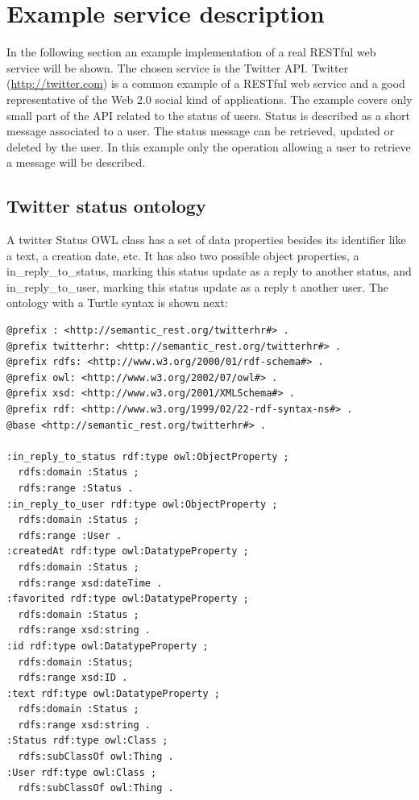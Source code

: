 \section{Example service description}
In the following section an example implementation of a real RESTful web service will be shown. The chosen service is the Twitter API. Twitter (\url{http://twitter.com}) is a common example of a RESTful web service and a good representative of the Web 2.0 social kind of applications. The example covers only small part of the API related to the status of users. Status is described as a short message associated to a user. The status message can be retrieved, updated or deleted by the user. In this example only the operation allowing a user to retrieve a message will be described.

\subsection{Twitter status ontology}

A twitter Status OWL class has a set of data properties besides its identifier like a text, a creation date, etc. It has also two possible object properties, a in\_reply\_to\_status, marking this status update as a reply to another status, and in\_reply\_to\_user, marking this status update as a reply t another user. The ontology with a Turtle syntax is shown next:
\vspace{5 mm}
\begin{lstlisting}
@prefix : <http://semantic_rest.org/twitterhr#> .
@prefix twitterhr: <http://semantic_rest.org/twitterhr#> .
@prefix rdfs: <http://www.w3.org/2000/01/rdf-schema#> .
@prefix owl: <http://www.w3.org/2002/07/owl#> .
@prefix xsd: <http://www.w3.org/2001/XMLSchema#> .
@prefix rdf: <http://www.w3.org/1999/02/22-rdf-syntax-ns#> .
@base <http://semantic_rest.org/twitterhr#> .

:in_reply_to_status rdf:type owl:ObjectProperty ;
  rdfs:domain :Status ;
  rdfs:range :Status .
:in_reply_to_user rdf:type owl:ObjectProperty ;
  rdfs:domain :Status ;
  rdfs:range :User .
:createdAt rdf:type owl:DatatypeProperty ;
  rdfs:domain :Status ;
  rdfs:range xsd:dateTime .
:favorited rdf:type owl:DatatypeProperty ;
  rdfs:domain :Status ;
  rdfs:range xsd:string .
:id rdf:type owl:DatatypeProperty ;
  rdfs:domain :Status;
  rdfs:range xsd:ID .
:text rdf:type owl:DatatypeProperty ;
  rdfs:domain :Status ;
  rdfs:range xsd:string .
:Status rdf:type owl:Class ;
  rdfs:subClassOf owl:Thing .
:User rdf:type owl:Class ;
  rdfs:subClassOf owl:Thing .
\end{lstlisting} \vspace{5 mm}

